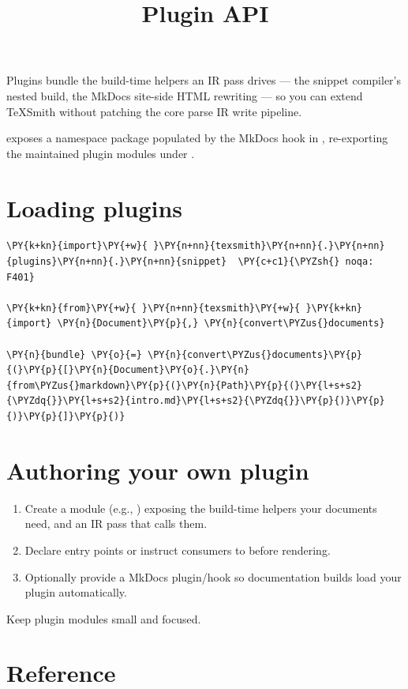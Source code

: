 \documentclass[a4paper,twoside]{article}
\title{Plugin API}
\author{}\date{}
\begin{document}
\maketitle
Plugins bundle the build-time helpers an IR pass drives --- the snippet
compiler's nested build, the MkDocs site-side HTML rewriting --- so you can extend
TeXSmith without patching the core parse IR write pipeline.

 exposes a namespace package populated by the MkDocs hook in
, re-exporting the maintained plugin modules under
.
\section{Loading plugins}
\begin{tscode}[lang=python, engine=pygments]
\begin{Verbatim}[commandchars=\\\{\},breaklines, breakanywhere, commandchars=\\\{\}]
\PY{k+kn}{import}\PY{+w}{ }\PY{n+nn}{texsmith}\PY{n+nn}{.}\PY{n+nn}{plugins}\PY{n+nn}{.}\PY{n+nn}{snippet}  \PY{c+c1}{\PYZsh{} noqa: F401}

\PY{k+kn}{from}\PY{+w}{ }\PY{n+nn}{texsmith}\PY{+w}{ }\PY{k+kn}{import} \PY{n}{Document}\PY{p}{,} \PY{n}{convert\PYZus{}documents}

\PY{n}{bundle} \PY{o}{=} \PY{n}{convert\PYZus{}documents}\PY{p}{(}\PY{p}{[}\PY{n}{Document}\PY{o}{.}\PY{n}{from\PYZus{}markdown}\PY{p}{(}\PY{n}{Path}\PY{p}{(}\PY{l+s+s2}{\PYZdq{}}\PY{l+s+s2}{intro.md}\PY{l+s+s2}{\PYZdq{}}\PY{p}{)}\PY{p}{)}\PY{p}{]}\PY{p}{)}
\end{Verbatim}
\end{tscode}
\section{Authoring your own plugin}
\begin{enumerate}
\item Create a module (e.g., ) exposing the build-time
helpers your documents need, and an IR pass that calls them.
\item Declare entry points or instruct consumers to 
before rendering.
\item Optionally provide a MkDocs plugin/hook so documentation builds load your
plugin automatically.
\end{enumerate}
Keep plugin modules small and focused.
\section{Reference}
\end{document}
